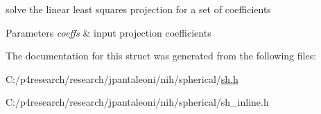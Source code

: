 \label{structnih_1_1_s_h__basis_ac3977f6d1133e5cbbfc72b5478b9daae}
solve the linear least squares projection for a set of coefficients


\begin{DoxyParams}{\-Parameters}
{\em coeffs} & input projection coefficients \\
\hline
\end{DoxyParams}


\-The documentation for this struct was generated from the following files\-:\begin{DoxyCompactItemize}
\item 
\-C\-:/p4research/research/jpantaleoni/nih/spherical/\hyperlink{sh_8h}{sh.\-h}\item 
\-C\-:/p4research/research/jpantaleoni/nih/spherical/sh\-\_\-inline.\-h\end{DoxyCompactItemize}
